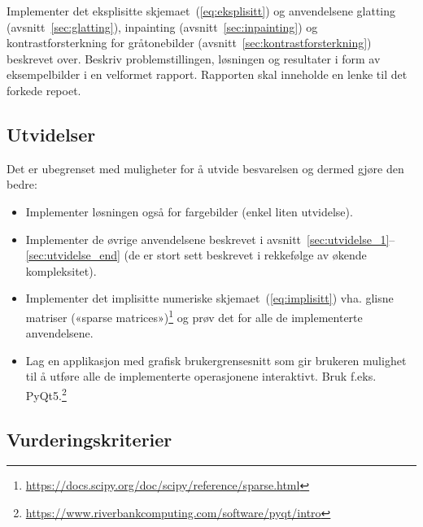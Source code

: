 \documentclass[11pt,a4paper]{article}
\begin{document}
Implementer det eksplisitte skjemaet~(\ref{eq:eksplisitt}) og anvendelsene glatting (avsnitt~\ref{sec:glatting}), inpainting (avsnitt~\ref{sec:inpainting}) og kontrastforsterkning for gråtonebilder (avsnitt~\ref{sec:kontrastforsterkning}) beskrevet over. Beskriv problemstillingen, løsningen og resultater i form av eksempelbilder i en velformet rapport. Rapporten skal inneholde en lenke til det forkede repoet.

\subsection{Utvidelser}

Det er ubegrenset med muligheter for å utvide besvarelsen og dermed gjøre den bedre:
\begin{itemize}[noitemsep]
\item Implementer løsningen også for fargebilder (enkel liten   utvidelse).
\item Implementer de øvrige anvendelsene beskrevet i avsnitt~\ref{sec:utvidelse_1}--\ref{sec:utvidelse_end} (de er   stort sett beskrevet i rekkefølge av økende kompleksitet).
\item Implementer det implisitte numeriske skjemaet~(\ref{eq:implisitt}) vha. glisne matriser («sparse   matrices»)\footnote{\url{https://docs.scipy.org/doc/scipy/reference/sparse.html}} og prøv det for alle de implementerte anvendelsene.
\item Lag en applikasjon med grafisk brukergrensesnitt som gir   brukeren mulighet til å utføre alle de implementerte operasjonene   interaktivt. Bruk f.eks.   PyQt5.\footnote{\url{https://www.riverbankcomputing.com/software/pyqt/intro}}
\end{itemize}

\subsection{Vurderingskriterier}
\end{document}

